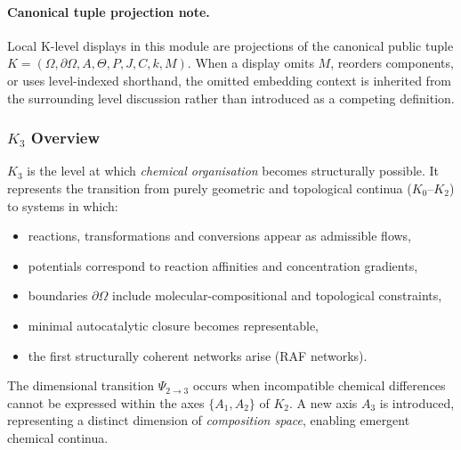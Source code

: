 



\paragraph{Canonical tuple projection note.}
Local K-level displays in this module are projections of the canonical public tuple \(K=(\Omega,\partial\Omega,A,\Theta,P,J,C,k,M)\). When a display omits \(M\), reorders components, or uses level-indexed shorthand, the omitted embedding context is inherited from the surrounding level discussion rather than introduced as a competing definition.

\subsubsection{\texorpdfstring{$K_3$}{K_3} Overview}
\label{sec:k3-overview}

$K_3$ is the level at which \emph{chemical organisation} becomes
structurally possible. It represents the transition from purely geometric
and topological continua ($K_0$--$K_2$) to systems in which:
\begin{itemize}
    \item reactions, transformations and conversions appear as admissible
          flows,
    \item potentials correspond to reaction affinities and concentration
          gradients,
    \item boundaries $\partial\Omega$ include molecular-compositional and
          topological constraints,
    \item minimal autocatalytic closure becomes representable,
    \item the first structurally coherent networks arise (RAF networks).
\end{itemize}

The dimensional transition $\Psi_{2\to3}$ occurs when incompatible
chemical differences cannot be expressed within the axes $\{A_1,A_2\}$ of
$K_2$. A new axis $A_3$ is introduced, representing a distinct dimension
of \emph{composition space}, enabling emergent chemical continua.

